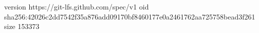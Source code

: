 version https://git-lfs.github.com/spec/v1
oid sha256:42026c2dd7542f35a876add09170bf8460177e0a2461762aa725758bead3f261
size 153373
